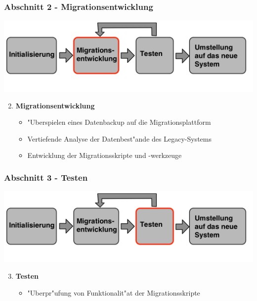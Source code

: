 \documentclass{beamer}
\begin{document}
	\begin{frame}
		\frametitle{Abschnitt 2 - Migrationsentwicklung}
		
		\centering
		\includegraphics[width=\textwidth]{../images/prozessmodell2t.png}\\
		
		\begin{enumerate}
			\setcounter{enumi}{1}
			
			\item \textbf{Migrationsentwicklung}
			\begin{itemize}
				\item "Uberspielen eines Datenbackup auf die Migrationsplattform
				\item Vertiefende Analyse der Datenbest"ande des Legacy-Systems
				\item Entwicklung der Migrationsskripte und -werkzeuge
			\end{itemize}
			
		\end{enumerate}
	\end{frame}
	
	\begin{frame}
		\frametitle{Abschnitt 3 - Testen}
		
		\centering
		\includegraphics[width=\textwidth]{../images/prozessmodell3t.png}\\
		
		\begin{enumerate}
			\setcounter{enumi}{2}
			
			\item \textbf{Testen}
			\begin{itemize}
				\item "Uberpr"ufung von Funktionalit"at der Migrationsskripte
			\end{itemize}
			
		\end{enumerate}
	\end{frame}
	
\end{document}

